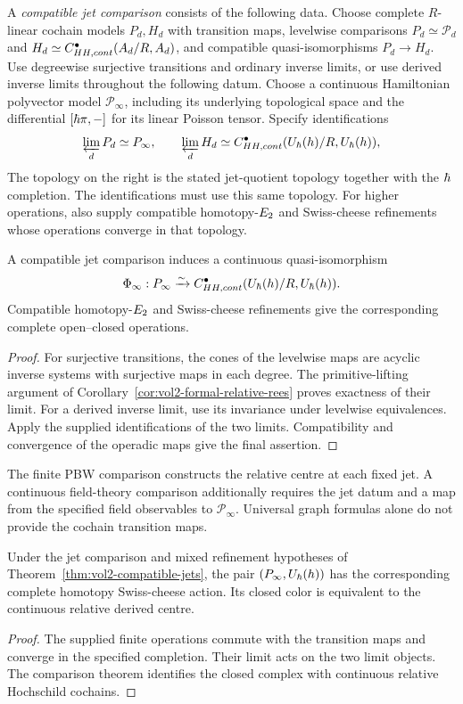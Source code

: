 A \emph{compatible jet comparison} consists of the following data.
Choose complete $R$-linear cochain models $P_d,H_d$ with transition maps,
levelwise comparisons $P_d\simeq\mathcal P_d$ and
$H_d\simeq C^\bullet_{HH,cont}(A_d/R,A_d)$,
and compatible quasi-isomorphisms $P_d\to H_d$.
Use degreewise surjective transitions and ordinary inverse limits,
or use derived inverse limits throughout the following datum.
Choose a continuous Hamiltonian polyvector model $\mathcal P_\infty$,
including its underlying topological space and the differential
$[\hbar\pi,-]$ for its linear Poisson tensor.
Specify identifications
\[
 \varprojlim_dP_d\simeq P_\infty,
 \qquad
 \varprojlim_dH_d\simeq
 C^\bullet_{HH,cont}
 (U_\hbar(h)/R,U_\hbar(h)),
\]
The topology on the right is the stated jet-quotient topology together
with the $\hbar$ completion.
The identifications must use this same topology.
For higher operations, also supply compatible homotopy-$E_2$ and
Swiss-cheese refinements whose operations converge in that topology.

\begin{theorem}\label{thm:vol2-compatible-jets}
A compatible jet comparison induces a continuous quasi-isomorphism
\[
 \Phi_\infty:P_\infty
 \xrightarrow{\sim}
 C^\bullet_{HH,cont}
 (U_\hbar(h)/R,U_\hbar(h)).
\]
Compatible homotopy-$E_2$ and Swiss-cheese refinements give the
corresponding complete open--closed operations.
\end{theorem}
\begin{proof}
For surjective transitions, the cones of the levelwise maps are
acyclic inverse systems with surjective maps in each degree.
The primitive-lifting argument of
Corollary~\ref{cor:vol2-formal-relative-rees} proves exactness of their limit.
For a derived inverse limit, use its invariance under levelwise equivalences.
Apply the supplied identifications of the two limits.
Compatibility and convergence of the operadic maps give the final assertion.
\end{proof}

The finite PBW comparison constructs the relative centre at each fixed jet.
A continuous field-theory comparison additionally requires the jet datum
and a map from the specified field observables to $\mathcal P_\infty$.
Universal graph formulas alone do not provide the cochain transition maps.

\begin{corollary}
Under the jet comparison and mixed refinement hypotheses of
Theorem~\ref{thm:vol2-compatible-jets}, the pair
$(P_\infty,U_\hbar(h))$
has the corresponding complete homotopy Swiss-cheese action.
Its closed color is equivalent to the continuous relative derived centre.
\end{corollary}
\begin{proof}
The supplied finite operations commute with the transition maps
and converge in the specified completion.
Their limit acts on the two limit objects.
The comparison theorem identifies the closed complex with continuous relative Hochschild cochains.
\end{proof}


